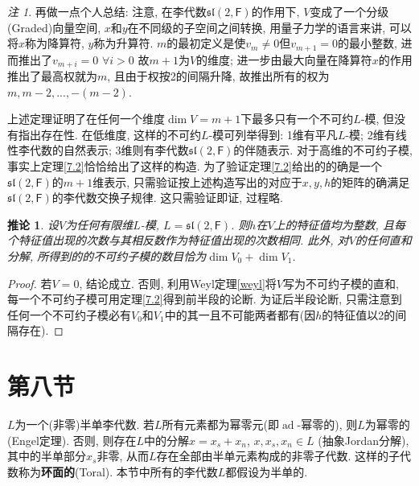 \documentclass{ctexart}%
\newtheorem{corollary}{推论}
\theoremstyle{definition}
\theoremstyle{remark}
\newtheorem{remark}{注}
\DeclareMathOperator{\ad}{ad}
\begin{document}
\begin{remark}
再做一点个人总结: 注意, 在李代数$\mathfrak{sl}(2,\mathsf{F})$的作用下, $V$变成了一个分级(Graded)向量空间, $x$和$y$在不同级的子空间之间转换, 用量子力学的语言来讲, 可以将$x$称为降算符, $y$称为升算符. $m$的最初定义是使$v_m\neq 0$但$v_{m+1}=0$的最小整数, 进而推出了$v_{m+i}=0$ $\forall i>0$ 故$m+1$为$V$的维度; 进一步由最大向量在降算符$x$的作用推出了最高权就为$m$, 且由于权按2的间隔升降, 故推出所有的权为$m,m-2,...,-(m-2)$. 

上述定理证明了在任何一个维度$\dim V=m+1$下最多只有一个不可约$L$-模, 但没有指出存在性. 在低维度, 这样的不可约$L$-模可列举得到: 1维有平凡$L$-模; 2维有线性李代数的自然表示; 3维则有李代数$\mathfrak{sl}(2,\mathsf{F})$的伴随表示. 对于高维的不可约子模, 事实上定理\ref{7.2}恰恰给出了这样的构造. 为了验证定理\ref{7.2}给出的的确是一个$\mathfrak{sl}(2,\mathsf{F})$的$m+1$维表示, 只需验证按上述构造写出的对应于$x,y,h$的矩阵的确满足$\mathfrak{sl}(2,\mathsf{F})$的李代数交换子规律. 这只需验证即证, 过程略.  
\end{remark}

\begin{corollary}\label{7.2c}
设$V$为任何有限维$L$-模, $L=\mathfrak{sl}(2,\mathsf{F})$. 则$h$在$V$上的特征值均为整数, 且每个特征值出现的次数与其相反数作为特征值出现的次数相同. 此外, 对$V$的任何直和分解, 所得到的的不可约子模的数目恰为$\dim V_0+ \dim V_1$.
\end{corollary}
\begin{proof}
若$V=0$, 结论成立. 否则, 利用Weyl定理\ref{weyl}将$V$写为不可约子模的直和, 每一个不可约子模可用定理\ref{7.2}得到前半段的论断. 为证后半段论断, 只需注意到任何一个不可约子模必有$V_0$和$V_1$中的其一且不可能两者都有(因$h$的特征值以2的间隔存在).
\end{proof}


\section*{第八节}

$L$为一个(非零)半单李代数. 若$L$所有元素都为幂零元(即$\ad$-幂零的), 则$L$为幂零的(Engel定理). 否则, 则存在$L$中的分解$x=x_s+x_n$, $x,x_s,x_n\in L$ (抽象Jordan分解), 其中的半单部分$x_s$非零, 从而$L$存在全部由半单元素构成的非零子代数. 这样的子代数称为\textbf{环面的}(Toral). 本节中所有的李代数$L$都假设为半单的.
\end{document}
